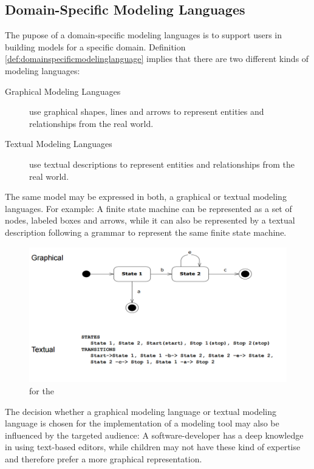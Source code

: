 \documentclass[runningheads,a4paper]{llncs}
\begin{document}
 \subsection{Domain-Specific Modeling Languages}
 The pupose of a domain-specific modeling languages is to support users in building models for a specific domain.
 Definition \ref{def:domainspecificmodelinglanguage} implies that there are two different kinds of modeling languages:
  \begin{description}
     \item[Graphical Modeling Languages] use graphical shapes, lines and arrows  to represent entities and relationships from the real world.
     \item[Textual Modeling Languages] use textual descriptions to represent entities and relationships from the real world.
  \end{description}
 The same model may be expressed in both, a graphical or textual modeling languages.
 For example: A finite state machine can be represented as a set of nodes, labeled boxes and arrows, while it can also be 
 represented by a textual description following a grammar to represent the same finite state machine.
  \begin{figure}[H]
      \centering
      \includegraphics[width=\textwidth]{images/GraficalTextualComparison.PNG}
      \label{compare:textgraphiclang}for the
    \end{figure}
 The decision whether a graphical modeling language or textual modeling language is chosen for the implementation of a modeling tool 
 may also be influenced by the targeted audience: A software-developer has a deep knowledge in using text-based editors, while 
 children may not have these kind of expertise and therefore prefer a more graphical representation. 
\end{document}
